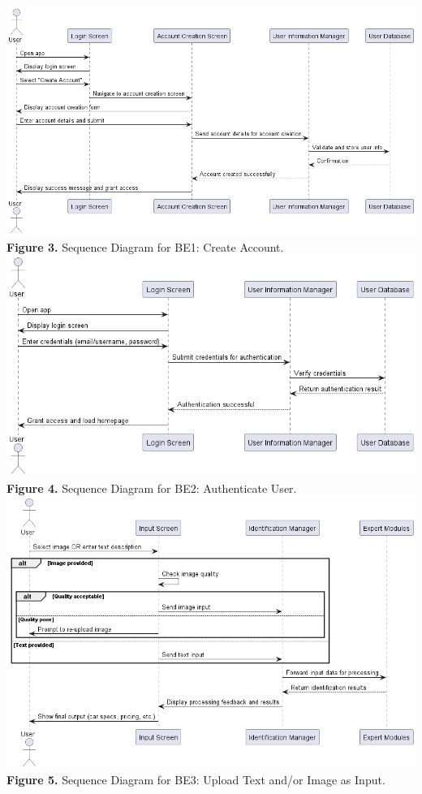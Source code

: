 \documentclass[]{article}
\begin{document}
\begin{center}
	\includegraphics[scale=0.5]{Sequence Diagrams/BE1_Sequence_Diagram.png}\\
	\textbf{Figure 3.} Sequence Diagram for BE1: Create Account.\\

	\includegraphics[scale=0.6]{Sequence Diagrams/BE2_Sequence_Diagram.png}\\
	\textbf{Figure 4.} Sequence Diagram for BE2: Authenticate User.\\

	\includegraphics[scale=0.55]{Sequence Diagrams/BE3_Sequence_Diagram.png}\\
	\textbf{Figure 5.} Sequence Diagram for BE3: Upload Text and/or Image as Input.\\


\end{center}
\end{document}
